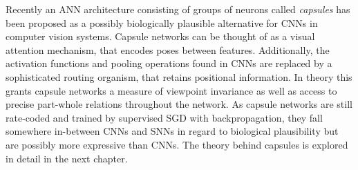 Recently an ANN architecture consisting of groups of neurons called \emph{capsules} has been proposed as a possibly biologically plausible alternative for CNNs in computer vision systems. Capsule networks can be thought of as a visual attention mechanism, that encodes poses between features. Additionally, the activation functions and pooling operations found in CNNs are replaced by a sophisticated routing organism, that retains positional information. In theory this grants capsule networks a measure of viewpoint invariance as well as access to precise part-whole relations throughout the network. As capsule networks are still rate-coded and trained by supervised SGD with backpropagation, they fall somewhere in-between CNNs and SNNs in regard to biological plausibility but are possibly more expressive than CNNs. The theory behind capsules is explored in detail in the next chapter.